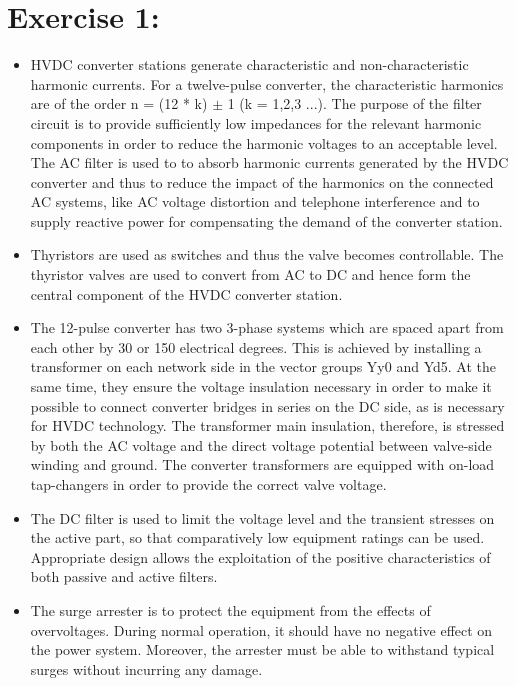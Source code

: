 \justifying

\section*{\textbf{Exercise 1: }}
\begin{itemize}
    \item HVDC converter stations generate characteristic and non-characteristic harmonic currents. For a twelve-pulse converter, the characteristic harmonics are of the order n = (12 * k) $\pm$ 1 (k = 1,2,3 ...). The purpose of the filter circuit is to provide sufficiently low impedances for the relevant harmonic components in order to reduce the harmonic voltages to an acceptable level. The AC filter is used to to absorb harmonic currents generated by the HVDC converter and thus to reduce the impact of the harmonics on the connected AC systems, like AC voltage distortion and telephone interference and to supply reactive power for compensating the demand of the converter station.
    \item Thyristors are used as switches and thus the valve becomes controllable. The thyristor valves are used to convert from AC to DC and hence form the central component of the HVDC converter station.  
    \item The 12-pulse converter has two 3-phase systems which are spaced apart from each other by 30 or 150 electrical degrees. This is achieved by installing a transformer on each network side in the vector groups Yy0 and Yd5. At the same time, they ensure the voltage insulation necessary in order to make it possible to connect converter bridges in series on the DC side, as is necessary for HVDC technology. The transformer main insulation, therefore, is stressed by both the AC voltage and the direct voltage potential between valve-side winding and ground. The converter transformers are equipped with on-load tap-changers in order to provide the correct valve voltage.
    \item  The DC filter is used to limit the voltage level and the transient stresses on the active part, so that comparatively low equipment ratings can be used. Appropriate design allows the exploitation of the positive characteristics of both passive and active filters.
    \item The surge arrester is to protect the equipment from the effects of overvoltages. During normal operation, it should have no negative effect on the power system. Moreover, the arrester must be able to withstand typical surges without incurring any damage.
\end{itemize}
